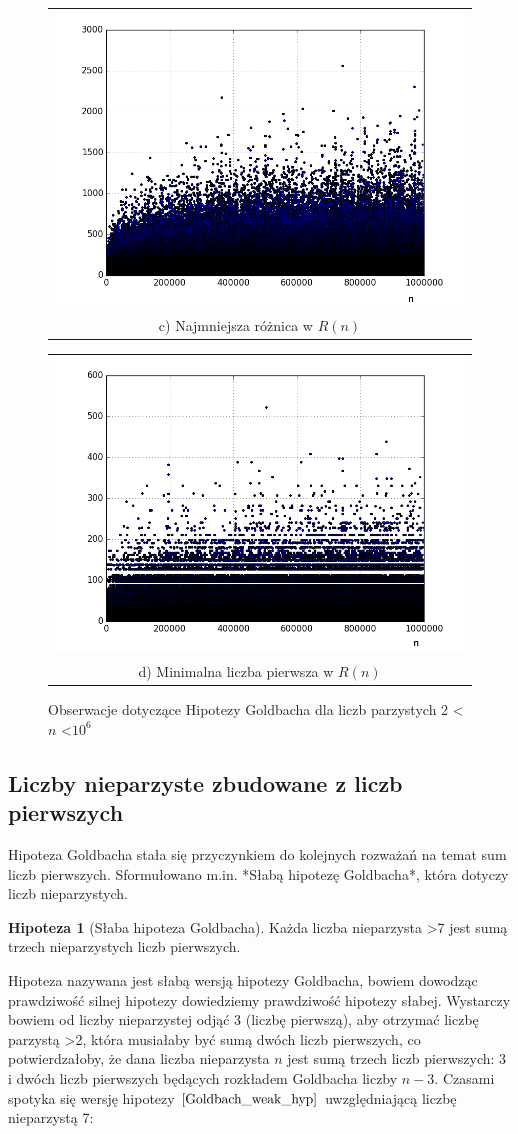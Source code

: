 \documentclass[10pt,onecolumn]{article}
\makeatletter
\theoremstyle{definition}
\theoremstyle{hypothesis}
\newtheorem{hypothesis}{Hipoteza}
\theoremstyle{capability}
\newcommand{\subsubfloat}[2]{%
  \begin{tabular}{@{}c@{}}#1\\#2\end{tabular}%
}
\makeatother
\begin{document}
\begin{figure}
{\begin{minipage}{\columnwidth}
  \subsubfloat{\includegraphics[width=0.45\columnwidth]{f_goldbach_min_diff_pairs}}{c) Najmniejsza różnica w $R(n)$}%
  \qquad
  \subsubfloat{\includegraphics[width=0.45\columnwidth]{f_goldbach_min_prime_in_sum}}{d) Minimalna liczba pierwsza w $R(n)$}
  \end{minipage}}

\caption{Obserwacje dotyczące Hipotezy Goldbacha dla liczb parzystych 2 \textless $n$ \textless $10^6$}
\end{figure}

\subsection{Liczby nieparzyste zbudowane z liczb pierwszych}

Hipoteza Goldbacha stała się przyczynkiem do kolejnych rozważań na temat sum liczb pierwszych. Sformułowano m.in. *Słabą hipotezę Goldbacha*, która dotyczy liczb nieparzystych.

\begin{hypothesis}[Słaba hipoteza Goldbacha]
Każda liczba nieparzysta \textgreater 7 jest sumą trzech nieparzystych liczb pierwszych.
\label{Goldbach_weak_hyp}
\end{hypothesis}

Hipoteza nazywana jest słabą wersją hipotezy Goldbacha, bowiem dowodząc prawdziwość silnej hipotezy dowiedziemy prawdziwość hipotezy słabej. Wystarczy bowiem od liczby nieparzystej odjąć 3 (liczbę pierwszą), aby otrzymać liczbę parzystą \textgreater 2, która musiałaby być sumą dwóch liczb pierwszych, co potwierdzałoby, że dana liczba nieparzysta $n$ jest sumą trzech liczb pierwszych: 3 i dwóch liczb pierwszych będących rozkładem Goldbacha liczby $n-3$. Czasami spotyka się wersję hipotezy $\ref{Goldbach_weak_hyp}$ uwzględniającą liczbę nieparzystą 7:
\end{document}

